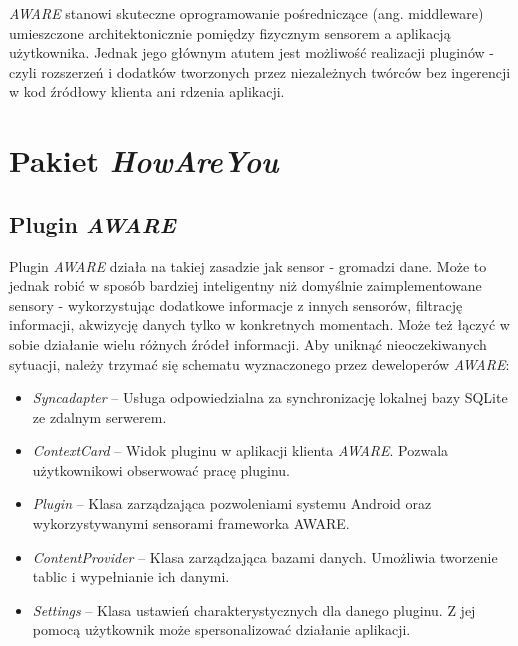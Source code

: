 \textit{AWARE} stanowi skuteczne oprogramowanie pośredniczące (ang. middleware) umieszczone architektonicznie pomiędzy fizycznym sensorem a aplikacją użytkownika. Jednak jego głównym atutem jest możliwość realizacji pluginów - czyli rozszerzeń i dodatków tworzonych przez niezależnych twórców bez ingerencji w kod źródłowy klienta ani rdzenia aplikacji\cite{AwareFramework}. 



\section{Pakiet \textit{HowAreYou}}
\label{sec:pakietHowAreYou}


\subsection{Plugin \textit{AWARE}}

Plugin \textit{AWARE} działa na takiej zasadzie jak sensor - gromadzi dane. Może to jednak robić w sposób bardziej inteligentny niż domyślnie zaimplementowane sensory - wykorzystując dodatkowe informacje z innych sensorów, filtrację informacji, akwizycję danych tylko w konkretnych momentach. Może też łączyć w sobie działanie wielu różnych źródeł informacji. Aby uniknąć nieoczekiwanych sytuacji, należy trzymać się schematu wyznaczonego przez deweloperów \textit{AWARE}:

\begin{itemize}
\item \textit{Syncadapter} -- Usługa odpowiedzialna za synchronizację lokalnej bazy SQLite ze zdalnym serwerem.

\item \textit{ContextCard} -- Widok pluginu w aplikacji klienta \textit{AWARE}. Pozwala użytkownikowi obserwować pracę pluginu.

\item \textit{Plugin} -- Klasa zarządzająca pozwoleniami systemu Android oraz wykorzystywanymi sensorami frameworka AWARE.

\item \textit{ContentProvider} -- Klasa zarządzająca bazami danych. Umożliwia tworzenie tablic i wypełnianie ich danymi.

\item \textit{Settings} -- Klasa ustawień charakterystycznych dla danego pluginu. Z jej pomocą użytkownik może spersonalizować działanie aplikacji.
\end{itemize}

